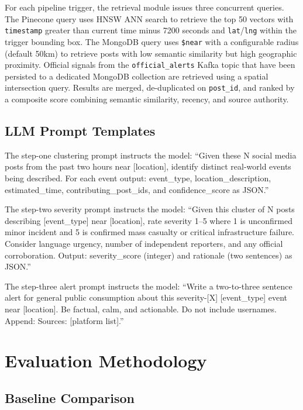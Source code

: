 \documentclass[conference]{IEEEtran}
\begin{document}
For each pipeline trigger, the retrieval module issues three concurrent queries.
The Pinecone query uses HNSW ANN search to retrieve the top 50 vectors with
\texttt{timestamp} greater than current time minus 7200 seconds and
\texttt{lat}/\texttt{lng} within the trigger bounding box. The MongoDB query
uses \texttt{\$near} with a configurable radius (default 50km) to retrieve
posts with low semantic similarity but high geographic proximity. Official
signals from the \texttt{official\_alerts} Kafka topic that have been persisted
to a dedicated MongoDB collection are retrieved using a spatial intersection
query. Results are merged, de-duplicated on \texttt{post\_id}, and ranked by
a composite score combining semantic similarity, recency, and source authority.

\subsection{LLM Prompt Templates}

The step-one clustering prompt instructs the model: ``Given these N social
media posts from the past two hours near [location], identify distinct
real-world events being described. For each event output: event\_type,
location\_description, estimated\_time, contributing\_post\_ids, and
confidence\_score as JSON.''

The step-two severity prompt instructs the model: ``Given this cluster of N posts
describing [event\_type] near [location], rate severity 1--5 where 1 is
unconfirmed minor incident and 5 is confirmed mass casualty or critical
infrastructure failure. Consider language urgency, number of independent
reporters, and any official corroboration. Output: severity\_score (integer)
and rationale (two sentences) as JSON.''

The step-three alert prompt instructs the model: ``Write a two-to-three sentence
alert for general public consumption about this severity-[X] [event\_type]
event near [location]. Be factual, calm, and actionable. Do not include
usernames. Append: Sources: [platform list].''

\section{Evaluation Methodology}

\subsection{Baseline Comparison}
\end{document}
